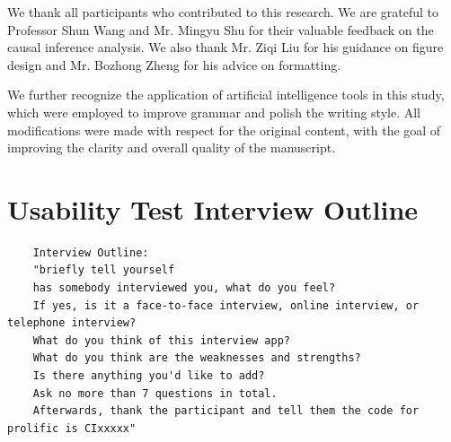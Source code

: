 \documentclass[sigchi,nonacm,manuscript]{acmart}
\begin{document}
\begin{acks}
We thank all participants who contributed to this research. We are grateful to Professor Shun Wang and Mr. Mingyu Shu for their valuable feedback on the causal inference analysis. We also thank Mr. Ziqi Liu for his guidance on figure design and Mr. Bozhong Zheng for his advice on formatting. 

We further recognize the application of artificial intelligence tools in this study, which were employed to improve grammar and polish the writing style. All modifications were made with respect for the original content, with the goal of improving the clarity and overall quality of the manuscript.
\end{acks}








\pagebreak

\appendix

\section{Usability Test Interview Outline}
\label{sec:usability_test_outline}
\begin{lstlisting}
    Interview Outline:
    "briefly tell yourself
    has somebody interviewed you, what do you feel?
    If yes, is it a face-to-face interview, online interview, or telephone interview?
    What do you think of this interview app? 
    What do you think are the weaknesses and strengths?
    Is there anything you'd like to add?
    Ask no more than 7 questions in total. 
    Afterwards, thank the participant and tell them the code for prolific is CIxxxxx"
\end{lstlisting}   
\newpage
\end{document}
